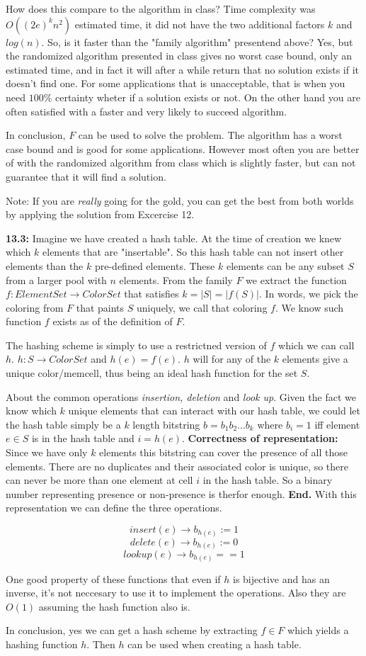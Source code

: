 \documentclass[a4paper,11pt]{article}
\begin{document}
How does this compare to the algorithm in class?
Time complexity was $O((2e)^kn^2)$ estimated time,
it did not have the two additional factors $k$ and $log(n)$.
So, is it faster than the "family algorithm" presentend above?
Yes, but the randomized algorithm presented in class gives no
worst case bound, only an estimated time, and in fact it will
after a while return that no solution exists if it doesn't find
one. For some applications that is unacceptable, that is when
you need $100\%$ certainty wheter if a solution exists or not.
On the other hand you are often satisfied with a faster and
very likely to succeed algorithm.

In conclusion, $F$ can be used to solve the problem.
The algorithm has a worst case bound and is good for some
applications. However most often you are better of with
the randomized algorithm from class which is slightly faster,
but can not guarantee that it will find a solution.

Note: If you are \emph{really} going for the gold, you
can get the best from both worlds by applying the solution
from Excercise 12.

\textbf{13.3:} Imagine we have created a hash table.
At the time of creation we knew which $k$ elements
that are "insertable". So this hash table can not insert
other elements than the $k$ pre-defined elements.
These $k$ elements can be any subset $S$ from a larger pool
with $n$ elements. From the family $F$ we extract the function
$f : ElementSet \to ColorSet$ that satisfies $k=|S|=|f(S)|$.
In words, we pick the coloring
from $F$ that paints $S$ uniquely, we call that coloring $f$.
We know such function $f$ exists as of the definition of $F$.

The hashing scheme is simply to use a restrictned
version of $f$ which we can call $h$. $h : S \to ColorSet$
and $h(e) = f(e)$. $h$ will for any of the $k$ elements
give a unique color/memcell, thus being an ideal hash
function for the set $S$.

About the common operations \emph{insertion, deletion}
and \emph{look up}. Given the fact we know which $k$ unique elements
that can interact with our hash table,
we could let the hash table simply
be a $k$ length bitstring $b = b_1 b_2 \dots b_k$ where
$b_i = 1$ iff element $e \in S$ is in the hash table
and $i = h(e)$.
\textbf{Correctness of representation:}  Since we have only $k$ elements
this bitstring can cover the presence of all those elements.
There are no duplicates and their associated color is unique,
so there can never be more than
one element at cell $i$ in the hash table. So
a binary number representing presence or non-presence
is therfor enough.
 \textbf{End.}
With this representation we can define the three operations.

\[
insert(e) \to b_{h(e)} := 1
\]
\[
delete(e) \to b_{h(e)} := 0
\]
\[
lookup(e) \to b_{h(e)} == 1
\]

One good property of these functions that even if $h$
is bijective and has an inverse, it's not neccesary
to use it to implement the operations. Also they
are $O(1)$ assuming the hash function also is.

In conclusion, yes we can get a hash scheme by extracting
$f \in F$ which yields a hashing function $h$. Then
$h$ can be used when creating a hash table.
\end{document}
